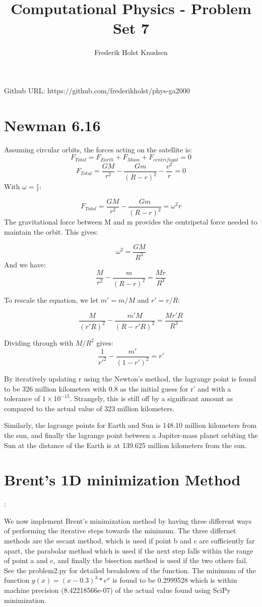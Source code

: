 \documentclass[11pt]{article}
\title{Computational Physics -  Problem Set 7}
\author{Frederik Holst Knudsen}
\begin{document}
\maketitle
Github URL: https://github.com/frederikholst/phys-ga2000
\section{Newman 6.16}
Assuming circular orbits, the forces acting on the satellite is:
$$F_{Total}=F_{Earth}+F_{Moon} + F_{centrifugal}=0$$
$$F_{Total}=\frac{GM}{r^2}-\frac{Gm}{(R-r)^2}-\frac{v^2}{r}=0$$
With $\omega =\frac{v}{r}$:

$$F_{Total}=\frac{GM}{r^2}-\frac{Gm}{(R-r)^2}=\omega^2r $$
The gravitational force between M and m provides the centripetal force needed to maintain the orbit. This gives:

$$\omega^2=\frac{GM}{R^3}$$
And we have:
$$\frac{M}{r^2}-\frac{m}{(R-r)^2}=\frac{Mr}{R^3} $$

To rescale the equation, we let $m'=m/M$ and $r'=r/R$:

$$\frac{M}{(r'R)^2}-\frac{m'M}{(R-r'R)^2}=\frac{Mr'R}{R^3} $$

Dividing through with $M/R^2$ gives:
$$\frac{1}{r'^2}-\frac{m'}{(1-r')^2}=r' $$

By iteratively updating r using the Newton's method, the lagrange point is found to be 326 million kilometers with 0.8 as the initial guess for r' and with a tolerance of $1\times 10^{-15}$. Strangely, this is still off by a significant amount as compared to the actual value of 323 million kilometers. 

Similarly, the lagrange points for Earth and Sun is 148.10 million kilometers from the sun, and finally the lagrange point between a Jupiter-mass planet orbiting the Sun at the distance of the Earth is at 139.625 million kilometers from the sun. 

\section{Brent's 1D minimization Method}:

We now implement Brent's minimization method by having three different ways of performing the iterative steps towards the minimum. The three differnet methods are the secant method, which is used if point b and c are sufficiently far apart, the parabolar method which is used if the next step falls within the range of point a and c, and finally the bisection method is used if the two others fail. See the problem2.py for detailed breakdown of the function. The minimum of the function $y(x)=(x-0.3)^3*e^{x}$ is found to be 0.2999528 which is within machine precision (8.42218566e-07) of the actual value found using SciPy minimization. 
\end{document}
